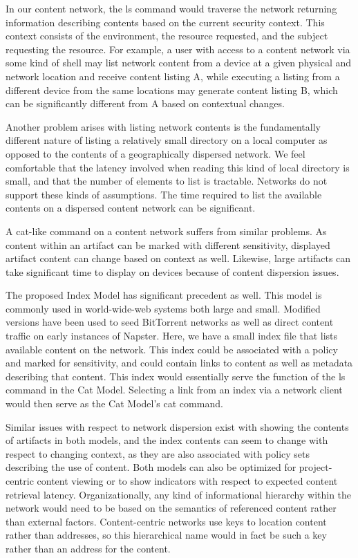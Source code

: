 In our content network, the ls command would traverse the network returning information describing contents based on the current security context.  This context consists of the environment, the resource requested, and the subject requesting the resource.  For example, a user with access to a content network via some kind of shell may list network content from a device at a given physical and network location and receive content listing A, while executing a listing from a different device from the same locations may generate content listing B, which can be significantly different from A based on contextual changes.

Another problem arises with listing network contents is the fundamentally different nature of listing a relatively small directory on a local computer as opposed to the contents of a geographically dispersed network.  We feel comfortable that the latency involved when reading this kind of local directory is small, and that the number of elements to list is tractable.  Networks do not support these kinds of assumptions.  The time required to list the available contents on a dispersed content network can be significant.

A cat-like command on a content network suffers from similar problems.  As content within an artifact can be marked with different sensitivity, displayed artifact content can change based on context as well.  Likewise, large artifacts can take significant time to display on devices because of content dispersion issues.

The proposed Index Model has significant precedent as well.  This model is commonly used in world-wide-web systems both large and small.  Modified versions have been used to seed BitTorrent networks as well as direct content traffic on early instances of Napster.  Here, we have a small index file that lists available content on the network.  This index could be associated with a policy and marked for sensitivity, and could contain links to content as well as metadata describing that content.  This index would essentially serve the function of the ls command in the Cat Model.  Selecting a link from an index via a network client would then serve as the Cat Model's cat command.

Similar issues with respect to network dispersion exist with showing the contents of artifacts in both models, and the index contents can seem to change with respect to changing context, as they are also associated with policy sets describing the use of content.  Both models can also be optimized for project-centric content viewing or to show indicators with respect to expected content retrieval latency.  Organizationally, any kind of informational hierarchy within the network would need to be based on the semantics of referenced content rather than external factors.  Content-centric networks use keys to location content rather than addresses, so this hierarchical name would in fact be such a key rather than an address for the content.

